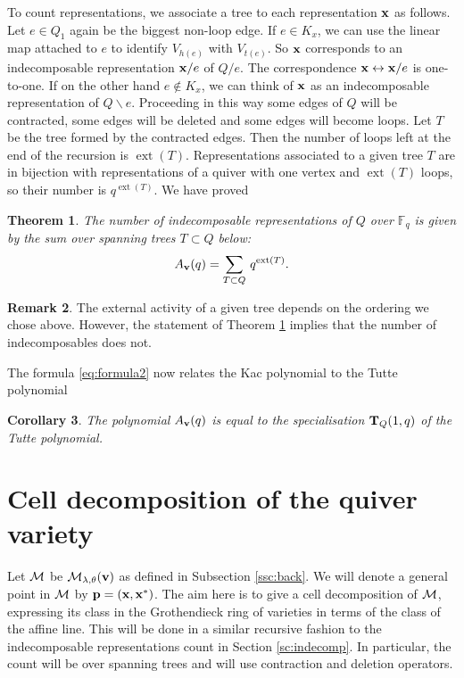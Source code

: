 \documentclass{amsart}
\newtheorem{thm}{Theorem}[section]
\newtheorem{cor}[thm]{Corollary}
\theoremstyle{definition}
\newtheorem{rem}[thm]{Remark}
\DeclareMathOperator{\extact}{ext}
\begin{document}
To count representations, we associate a tree to each representation $\mathbf{x}$ as follows. Let $e\in Q_1$ again be the biggest non-loop edge. If $e\in K_x$, we can use the linear map attached to $e$ to identify $V_{h(e)}$ with $V_{t(e)}$. So $\mathbf{x}$ corresponds to an indecomposable representation $\mathbf{x}/e$ of $Q/e$. The correspondence $\mathbf{x} \leftrightarrow \mathbf{x}/e$ is one-to-one. If on the other hand $e\notin K_x$, we can think of $\mathbf{x}$ as an indecomposable representation of $Q\backslash e$. Proceeding in this way some edges of $Q$ will be contracted, some edges will be deleted and some edges will become loops. Let $T$ be the tree formed by the contracted edges. Then the number of loops left at the end of the recursion is $\extact(T)$. Representations associated to a given tree $T$ are in bijection with representations of a quiver with one vertex and $\extact({T})$ loops, so their number is $q^{\extact({T})}$. We have proved

\begin{thm}\label{thm:numindecom}
The number of indecomposable representations of $Q$ over $\mathbb{F}_q$ is given by the sum over spanning trees $T \subset Q$ below: $$A_\bfv(q)=\sum_{T\subset Q}\, q^{\extact({T})}.$$
\end{thm}

\begin{rem}
The external activity of a given tree depends on the ordering we chose above. 
However, the statement of Theorem \ref{thm:numindecom} implies that the number of indecomposables does not.
\end{rem}

The formula \eqref{eq:formula2} now relates the Kac polynomial to the Tutte polynomial

\begin{cor}
The polynomial $A_{\mathbf{v}}(q)$ is equal to the specialisation $\mathbf{T}_Q(1,q)$ of the Tutte polynomial.
\end{cor}


\section{Cell decomposition of the quiver variety}\label{sc:qvariety}

Let $\mathcal{M}$ be $\mathcal{M}_{\lambda, \theta}(\mathbf{v})$ as defined in Subsection \ref{ssc:back}. We will denote a general point in $\mathcal{M}$ by $\mathbf{p} = (\mathbf{x}, \mathbf{x}^*)$. 
The aim here is to give a cell decomposition of $\mathcal{M}$, expressing its class in the Grothendieck ring of varieties in terms of the class of the affine line. 
This will be done in a similar recursive fashion to the indecomposable representations count in Section \ref{sc:indecomp}.
In particular, the count will be over spanning trees and will use contraction and deletion operators.
\end{document}
